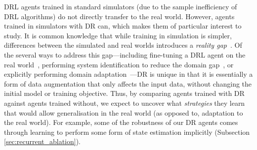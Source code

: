 DRL agents trained in standard simulators (due to the sample inefficiency of DRL algorithms) do not directly transfer to the real world. However, agents trained in simulators with DR can, which makes them of particular interest to study. It is common knowledge that while training in simulation is simpler, differences between the simulated and real worlds introduces a \emph{reality gap}~\cite{jakobi1995noise}. Of the several ways to address this gap---including fine-tuning a DRL agent on the real world~\cite{rusu2017sim}, performing system identification to reduce the domain gap~\cite{chebotar2018closing}, or explicitly performing domain adaptation~\cite{tzeng2015towards}---DR is unique in that it is essentially a form of data augmentation that only affects the input data, without changing the initial model or training objective. Thus, by comparing agents trained with DR against agents trained without, we expect to uncover what \emph{strategies} they learn that would allow generalisation in the real world (as opposed to, adaptation to the real world). For example, some of the robustness of our DR agents comes through learning to perform some form of state estimation implicitly (Subsection \ref{sec:recurrent_ablation}).

\begin{table}
  \label{tbl:random_summary}
  \centering
   \caption{DR textures used during training. At every environment timestep, for each component (e.g., robotic arm, skybox, table; the Jaco robot has 13 components, and the Fetch robot has 19 components), the appearance of the component is rendered using a sequential sampling process. In the first step of the sampling process, one of each of the 4 possible choices is made with the same probability, then the subsequent appearance of each component is determined by a second draw, described in the rightmost column of the table. Each RGB channel is drawn uniformly from $\{0 \ldots 255\}$. The details of each option are described in Table~\ref{tbl:texture_expression}.}
\end{table}

